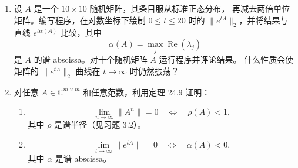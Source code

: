 \documentclass[UTF8,fontset=none,12pt]{ctexart}
\begin{document}
\begin{enumerate}[label=\textbf{24.\arabic*.},leftmargin=*]
    \item 设 $A$ 是一个 $10\times10$ 随机矩阵，其条目服从标准正态分布，
    再减去两倍单位矩阵。编写程序，在对数坐标下绘制
    $0\le t\le20$ 时的 $\|e^{tA}\|_2$，并将结果与直线
    $e^{t\alpha(A)}$ 比较，其中
    \[
    \alpha(A)=\max_j\operatorname{Re}(\lambda_j)
    \]
    是 $A$ 的谱 abscissa。对十个随机矩阵 $A$ 运行程序并评论结果。
    什么性质会使矩阵的 $\|e^{tA}\|_2$ 曲线在 $t\to\infty$ 时仍然振荡？

    \item 对任意 $A\in\mathbb{C}^{m\times m}$ 和任意范数，利用定理 24.9
    证明：
    \begin{enumerate}[label=(\alph*),leftmargin=2em]
        \item
        \[
        \lim_{n\to\infty}\|A^n\|=0
        \quad\Longleftrightarrow\quad
        \rho(A)<1,
        \]
        其中 $\rho$ 是谱半径（见习题 3.2）。
        \item
        \[
        \lim_{t\to\infty}\|e^{tA}\|=0
        \quad\Longleftrightarrow\quad
        \alpha(A)<0,
        \]
        其中 $\alpha$ 是谱 abscissa。
    \end{enumerate}
\end{enumerate}
\end{document}
